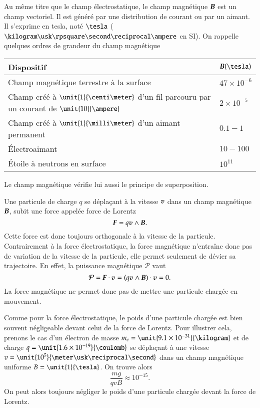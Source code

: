 \begin{defn}
	Au même titre que le champ électrostatique, le champ magnétique $\vecb$
	est un champ vectoriel. Il est généré par une distribution de courant ou 
	par un aimant. Il s'exprime en tesla, noté $\tesla$ ($\kilogram \usk
	\rpsquare \second \reciprocal \ampere$ en SI). On rappelle quelques ordres de
	grandeur du champ magnétique
	
	\begin{center}
	\begin{tabular}{l|l}
		\textbf{Dispositif} 	& $\vecb (\tesla)$ \\ \hline
		Champ magnétique terrestre à la surface & $47 \times 10^{-6}$ \\
		Champ créé à $\unit{1}{\centi \meter}$ d'un fil parcouru par 
		un courant de $\unit{10}{\ampere}$
								 & $2 \times 10^{-5}$ \\
		Champ créé à $\unit{1}{\milli \meter}$ d'un aimant permanent& $0.1 - 1$ \\
		Électroaimant & $10 - 100$ \\
		Étoile à neutrons en surface & $10^{11}$\\
	\end{tabular}
	\end{center}
Le champ magnétique vérifie lui aussi le principe de superposition.
\end{defn}

\begin{defn}
Une particule de charge $q$ se déplaçant à la vitesse $\vecv$ dans un champ magnétique
$\vecb$, subit une force appelée force de Lorentz
\begin{equation}
	\vecf = q\vecv \wedge \vecb.
\end{equation}
Cette force est donc toujours orthogonale à la vitesse de la particule.
Contrairement à la force électrostatique, la force magnétique n'entraîne donc pas 
de variation de la vitesse de la particule, elle permet seulement de dévier sa 
trajectoire. En effet, la puissance magnétique $\mathcal{P}$ vaut
\begin{equation*}
	\mathcal{P} = \vecf \cdot \vecv = (q\vecv \wedge \vecb) \cdot \vecv = 0.
\end{equation*}
La force magnétique ne permet donc pas de mettre une particule chargée en mouvement.
\end{defn}

Comme pour la force électrostatique, le poids d'une particule chargée est bien souvent 
négligeable devant celui de la force de Lorentz. Pour illustrer cela, prenons le 
cas d'un électron de masse $m_e = \unit{9.1 \times 10^{-31}}{\kilogram}$ et de
charge $q = \unit{1.6 \times 10^{-19}}{\coulomb}$ se déplaçant à une vitesse
$v = \unit{10^5}{\meter \usk \reciprocal \second}$ dans un champ magnétique uniforme
$B = \unit{1}{\tesla}$. On trouve alors
\begin{equation*}
	\dfrac{mg}{qvB} \approx 10^{-15}.
\end{equation*}
On peut alors toujours négliger le poids d'une particule chargée
devant la force de Lorentz.

